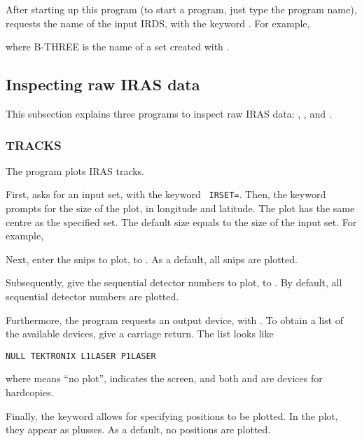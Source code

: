 After starting up this program (to start a program, just type the
program name),  requests the name of the input IRDS,
with the keyword .  For example,


where B-THREE is the name of a set created with .

\subsection{Inspecting raw IRAS data}
\label{ssec:Inspec}

This subsection explains three programs to inspect raw IRAS data:
, , and . 

\subsubsection{TRACKS}

The program  plots IRAS tracks.

First,  asks for an input set, with the keyword {\tt
IRSET=}.  Then, the keyword  prompts for the size of the
plot, in longitude and latitude.  The plot has the same centre as the
specified set.  The default size equals to the size of the input set. 
For example,


Next, enter the snips to plot, to .  As a default, all
snips are plotted. 

Subsequently, give the sequential detector numbers to plot, to
.  By default, all sequential detector numbers are
plotted. 

Furthermore, the program requests an output device, with
.  To obtain a list of the available devices, give a
carriage return.  The list looks like


\centerline{\tt NULL \hspace{1cm} TEKTRONIX \hspace{1cm} L1LASER
\hspace{1cm} P1LASER}

where  means ``no plot'',  indicates
the screen, and both  and  are devices
for hardcopies. 

Finally, the keyword  allows for specifying positions to
be plotted.  In the plot, they appear as plusses.  As a default, no
positions are plotted. 

